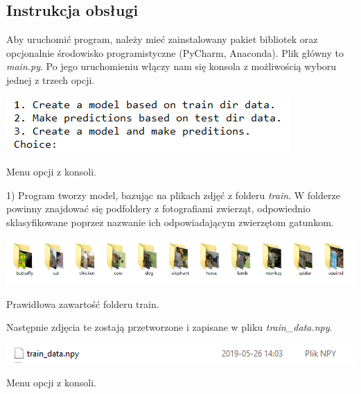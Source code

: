 \documentclass[12pt,a4paper]{article}
\begin{document}
	\subsection{Instrukcja obsługi}

	Aby uruchomić program, należy mieć zainstalowany pakiet bibliotek oraz opcjonalnie środowisko programistyczne (PyCharm, Anaconda). Plik główny to \textit{main.py}. Po jego uruchomieniu włączy nam się konsola z możliwością wyboru jednej z trzech opcji.
	\begin{center}
        \includegraphics[scale=1]{1.png}
        \begin{flushright}
            \begin{scriptsize}
            Menu opcji z konsoli.
            \end{scriptsize}
        \end{flushright}
    \end{center}
	1) Program tworzy model, bazując na plikach zdjęć z folderu \textit{train}. W folderze powinny znajdować się podfoldery z fotografiami zwierząt, odpowiednio sklasyfikowane poprzez nazwanie ich odpowiadającym zwierzętom gatunkom.
	\begin{center}
        \includegraphics[scale=0.6]{3.png}
        \begin{flushright}
            \begin{scriptsize}
            Prawidłowa zawartość folderu train.
            \end{scriptsize}
        \end{flushright}
    \end{center}
	Następnie zdjęcia te zostają przetworzone i zapisane w pliku \textit{train\_data.npy}.
	\begin{center}
        \includegraphics[scale=1]{2.png}
        \begin{flushright}
            \begin{scriptsize}
            Menu opcji z konsoli.
            \end{scriptsize}
        \end{flushright}
    \end{center}
\end{document}
